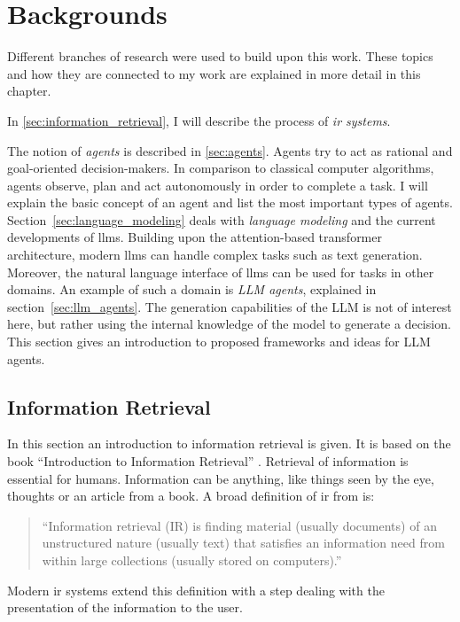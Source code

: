 \documentclass[../main.tex]{subfiles}
\begin{document}
\chapter{Backgrounds}
\label{ch:backgrounds}

Different branches of research were used to build upon this work.
These topics and how they are connected to my work
are explained in more detail in this chapter.

In \autoref{sec:information_retrieval},
I will describe the process of \emph{\gls{ir} systems}.

The notion of \emph{agents} is described in \autoref{sec:agents}.
Agents try to act as rational and goal-oriented decision-makers.
In comparison to classical computer algorithms,
agents observe, plan and act autonomously in order to complete a task.
I will explain the basic concept of an agent and list the most important types of agents.
Section~\ref{sec:language_modeling} deals with \emph{language modeling}
and the current developments of \glspl{llm}.
Building upon the attention-based transformer architecture, modern \glspl{llm}
can handle complex tasks such as text generation.
Moreover, the natural language interface of \glspl{llm} can be used for tasks in other domains.
An example of such a domain is \emph{LLM agents}, explained in section~\ref{sec:llm_agents}.
The generation capabilities of the LLM is not of interest here,
but rather using the internal knowledge of the model to generate a decision.
This section gives an introduction to proposed frameworks and ideas for LLM agents.

\section{Information Retrieval}
\label{sec:information_retrieval}
In this section an introduction to information retrieval is given.
It is based on the book ``Introduction to Information Retrieval''
\citeauthor{Manning2009} \cite{Manning2009}.
Retrieval of information is essential for humans.
Information can be anything, like things seen by the eye,
thoughts or an article from a book.
A broad definition of \gls{ir} from \cite{Manning2009} is:
\begin{quote}
    ``Information retrieval (IR) is finding material (usually documents)
    of an unstructured nature (usually text)
    that satisfies an information need
    from within large collections (usually stored on computers).''
\end{quote}
Modern \gls{ir} systems extend this definition with a step
dealing with the presentation of the information to the user.
\end{document}
